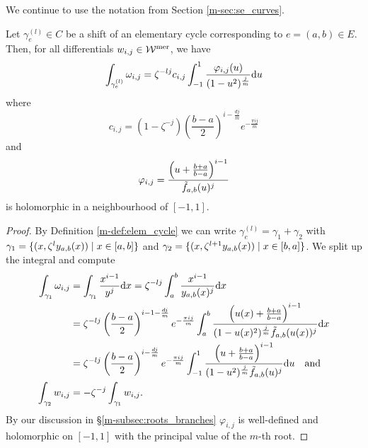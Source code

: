\documentclass[main.tex]{subfiles}
\begin{document}
  We continue to use the notation from Section \ref{m-sec:se_curves}.

  \begin{thm}\label{thm:periods}
   Let $\gamma_e^{(l)} \in C$ be a shift of an elementary cycle corresponding
   to $e = (a,b) \in E$. Then, for all differentials $w_{i,j} \in \mathcal{W}^{\text{mer}}$, we have
   \begin{equation}
      \label{eq:thm_periods_1} 
      \int_{\gamma_e^{(l)}} \omega_{i,j}  =  \zeta^{-lj} c_{i,j} \int_{-1}^1 \frac{\varphi_{i,j}(u)}{(1-u^2)^{\frac{j}{m}}}  \mathrm d u
   \end{equation}
   where
   \begin{equation}
    c_{i,j}   =  (1-\zeta^{-j}) \left(\frac{b-a}{2}\right)^{i-\frac{dj}{m}} e^{-\frac{\pi i j}{m}}
   \end{equation}
   and 
   \begin{equation}
    \varphi_{i,j}  = \frac{\left(u+\frac{b+a}{b-a}\right)^{i-1}}{\tilde{f}_{a,b}(u)^j}
   \end{equation}
   is holomorphic in a neighbourhood of $[-1,1]$.
  \end{thm}
  \begin{proof}
    By Definition \ref{m-def:elem_cycle} we can write $\gamma_e^{(l)} = \gamma_1 + \gamma_2$ with $\gamma_1 = \{  (x,\zeta^l y_{a,b}(x))  \mid  x \in [a,b]  \}$ and
    $\gamma_2 = \{  (x,\zeta^{l+1}y_{a,b}(x))  \mid  x \in [b,a]  \}$. We split up the integral and compute
    \begin{align}\label{eq:thm_periods_2}
    \begin{split}
     \int_{\gamma_1} \omega_{i,j}  & =  \int_{\gamma_1} \frac{x^{i-1}}{y^j}  \mathrm d x  =  \zeta^{-lj} \int_a^b \frac{x^{i-1}}{y_{a,b}(x)^j}  \mathrm d x \\  & = 
     \zeta^{-lj} \left(\frac{b-a}{2}\right)^{i-1-\frac{dj}{m}} e^{-\frac{\pi i j}{m}}
     \int_a^b \frac{\left(u(x)+\frac{b+a}{b-a}\right)^{i-1}}{(1-u(x)^2)^{\frac{j}{m}}\tilde{f}_{a,b}(u(x))^j}  \mathrm d x \\
      & =    \zeta^{-lj} \left(\frac{b-a}{2}\right)^{i-\frac{dj}{m}} e^{-\frac{\pi i j}{m}}
     \int_{-1}^1 \frac{\left(u+\frac{b+a}{b-a}\right)^{i-1}}{(1-u^2)^{\frac{j}{m}}\tilde{f}_{a,b}(u)^j}  \mathrm d u \quad \text{and} \\
    \int_{\gamma_2} w_{i,j}  & =  - \zeta^{-j} \int_{\gamma_1} w_{i,j}.
    \end{split}
  \end{align}
  By our discussion in \S \ref{m-subsec:roots_branches} $\varphi_{i,j}$ is
  well-defined and holomorphic on $[-1,1]$ with the principal value of the
      $m$-th root.
  \end{proof}
\end{document}
